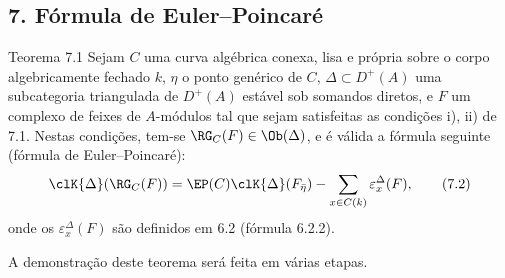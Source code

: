 \subsection*{7. Fórmula de Euler--Poincaré}

\begin{statement}{Teorema 7.1}
Sejam $C$ uma curva algébrica conexa, lisa e própria sobre o corpo algebricamente fechado $k$, $\eta$ o ponto genérico de $C$, $\Delta\subset D^+(A)$ uma subcategoria triangulada de $D^+(A)$ estável sob somandos diretos, e $F$ um complexo de feixes de $A$-módulos tal que sejam satisfeitas as condições i), ii) de 7.1. Nestas condições, tem-se $\RG_C(F)\in\Ob(\Delta)$, e é válida a fórmula seguinte (fórmula de Euler--Poincaré):
\[
\clK{\Delta}(\RG_C(F))
=
\EP(C)\clK{\Delta}(F_{\bar\eta})
-\sum_{x\in C(k)}\varepsilon_x^\Delta(F),
\tag{7.2}
\]
onde os $\varepsilon_x^\Delta(F)$ são definidos em 6.2 (fórmula 6.2.2).
\end{statement}

A demonstração deste teorema será feita em várias etapas.
